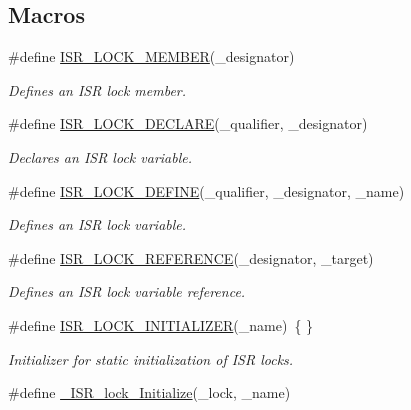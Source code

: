 \subsection*{Macros}
\begin{DoxyCompactItemize}
\item 
\#define \mbox{\hyperlink{group__RTEMSScoreISRLocks_ga09174e3121c9ec30b08d4ab09706833d}{I\+S\+R\+\_\+\+L\+O\+C\+K\+\_\+\+M\+E\+M\+B\+ER}}(\+\_\+designator)
\begin{DoxyCompactList}\small\item\em Defines an I\+SR lock member. \end{DoxyCompactList}\item 
\#define \mbox{\hyperlink{group__RTEMSScoreISRLocks_ga6702456c1dc97f69ebbbf1438c2b7e2e}{I\+S\+R\+\_\+\+L\+O\+C\+K\+\_\+\+D\+E\+C\+L\+A\+RE}}(\+\_\+qualifier,  \+\_\+designator)
\begin{DoxyCompactList}\small\item\em Declares an I\+SR lock variable. \end{DoxyCompactList}\item 
\#define \mbox{\hyperlink{group__RTEMSScoreISRLocks_ga24058ced522fcade5ccdc9bd477574f2}{I\+S\+R\+\_\+\+L\+O\+C\+K\+\_\+\+D\+E\+F\+I\+NE}}(\+\_\+qualifier,  \+\_\+designator,  \+\_\+name)
\begin{DoxyCompactList}\small\item\em Defines an I\+SR lock variable. \end{DoxyCompactList}\item 
\#define \mbox{\hyperlink{group__RTEMSScoreISRLocks_gad41ddc507bfa7022bd9355ff252888d2}{I\+S\+R\+\_\+\+L\+O\+C\+K\+\_\+\+R\+E\+F\+E\+R\+E\+N\+CE}}(\+\_\+designator,  \+\_\+target)
\begin{DoxyCompactList}\small\item\em Defines an I\+SR lock variable reference. \end{DoxyCompactList}\item 
\#define \mbox{\hyperlink{group__RTEMSScoreISRLocks_ga5fd39a446bb4cfbfc53838fd434d5f6c}{I\+S\+R\+\_\+\+L\+O\+C\+K\+\_\+\+I\+N\+I\+T\+I\+A\+L\+I\+Z\+ER}}(\+\_\+name)~\{ \}
\begin{DoxyCompactList}\small\item\em Initializer for static initialization of I\+SR locks. \end{DoxyCompactList}\item 
\#define \mbox{\hyperlink{group__RTEMSScoreISRLocks_gafeb5128bdf7cc2d29f9f51a85a7d0220}{\+\_\+\+I\+S\+R\+\_\+lock\+\_\+\+Initialize}}(\+\_\+lock,  \+\_\+name)

\end{DoxyCompactItemize}
